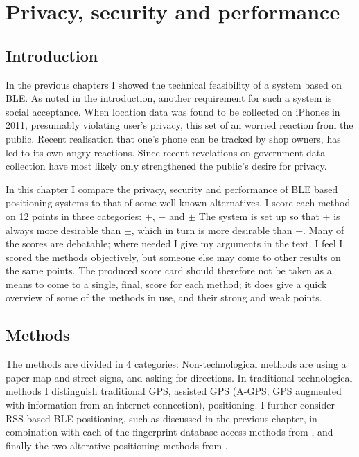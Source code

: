 \chapter{Privacy, security and performance}
\label{chap:security}

\newcommand{\yes}{\(+\)\xspace}
\newcommand{\no}{\(-\)\xspace}
\newcommand{\maybe}{\(\pm\)\xspace}
\newcommand{\cat}[1]{\begin{em}#1\end{em}}

\section{Introduction}
In the previous chapters I showed the technical feasibility of a \ptfp system based on BLE.
As noted in the introduction, another requirement for such a system is social acceptance.
When location data was found to be collected on iPhones in 2011, presumably violating user's privacy, this set of an worried reaction from the public.
Recent realisation that one's phone can be tracked by shop owners, has led to its own angry reactions.
Since recent revelations on government data collection have most likely only strengthened the public's desire for privacy.

In this chapter I compare the privacy, security and performance of BLE based positioning systems to that of some well-known alternatives.
I score each method on 12 points in three categories: \yes, \no and \maybe
The system is set up so that \yes is always more desirable than \maybe, which in turn is more desirable than \no.
Many of the scores are debatable; where needed I give my arguments in the text.
I feel I scored the methods objectively, but someone else may come to other results on the same points.
The produced score card should therefore not be taken as a means to come to a single, final, score for each method; it does give a quick overview of some of the methods in use, and their strong and weak points.

\section{Methods}
The methods are divided in 4 categories: Non-technological methods are using a paper map and street signs, and asking for directions.
In traditional technological methods I distinguish traditional GPS, assisted GPS (A-GPS; GPS augmented with information from an internet connection), \wifi positioning.
I further consider RSS-based BLE positioning, such as discussed in the previous chapter, in combination with each of the fingerprint-database access methods from , and finally the two alterative positioning methods from .

